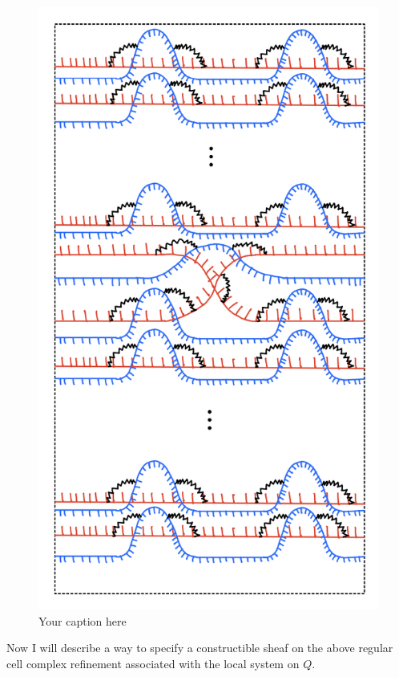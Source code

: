 \begin{definition}
\begin{figure}[H] 
    \centering
    \includegraphics[scale = 0.95]{diagrams/local_systems_on_as_diagrams/3.png}
    \caption{Your caption here}
    \label{fig:your-label}
\end{figure}
\end{definition}

Now I will describe a way to specify a constructible sheaf on the above regular cell complex refinement associated with the local system on $Q$. 

